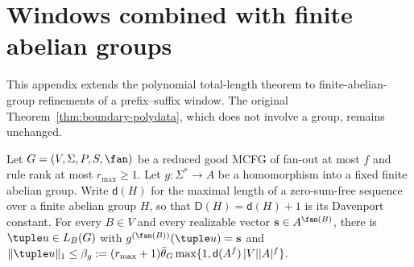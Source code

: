 \section{Windows combined with finite abelian groups}
\label{app:window-abelian}

This appendix extends the polynomial total-length theorem to
finite-abelian-group refinements of a prefix--suffix window.
The original Theorem~\ref{thm:boundary-polydata},
which does not involve a group, remains unchanged.

\begin{lemma}
\label{lem:group-typed-shortest}
Let $G=(V,\Sigma,P,S,\fan)$ be a reduced good
MCFG of fan-out at most $f$ and rule rank at most
$r_{\max}\ge1$. Let
$g:\Sigma^*\to A$ be a homomorphism into a fixed
finite abelian group. Write $\mathsf d(H)$ for the
maximal length of a zero-sum-free sequence over a
finite abelian group $H$, so that $\mathsf D(H)=\mathsf d(H)+1$
is its Davenport constant.
For every $B\in V$ and
every realizable vector
$\mathbf s\in A^{\fan(B)}$, there is
$\tuple u\in L_B(G)$ with
$g^{(\fan(B))}(\tuple u)=\mathbf s$
and
\(\|\tuple u\|_1\le\beta_g:= (r_{\max}+1)\bar\theta_G \max\{1,\mathsf d(A^f)\,|V||A|^f\}.\)
\end{lemma}

